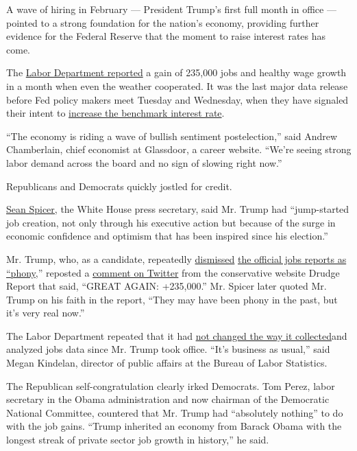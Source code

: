 A wave of hiring in February --- President Trump's first full month in
office --- pointed to a strong foundation for the nation's economy,
providing further evidence for the Federal Reserve that the moment to
raise interest rates has come.

The \href{https://www.bls.gov/news.release/empsit.nr0.htm}{Labor
Department reported} a gain of 235,000 jobs and healthy wage growth in a
month when even the weather cooperated. It was the last major data
release before Fed policy makers meet Tuesday and Wednesday, when they
have signaled their intent to
\href{https://www.nytimes.com/2017/03/03/business/economy/federal-reserve-interest-rates.html}{increase
the benchmark interest rate}.

``The economy is riding a wave of bullish sentiment postelection,'' said
Andrew Chamberlain, chief economist at Glassdoor, a career website.
``We're seeing strong labor demand across the board and no sign of
slowing right now.''

Republicans and Democrats quickly jostled for credit.

\href{http://www.cbsnews.com/live/video/sean-spicer-speaks-on-tweets-on-job-reports/}{Sean
Spicer,} the White House press secretary, said Mr. Trump had
``jump-started job creation, not only through his executive action but
because of the surge in economic confidence and optimism that has been
inspired since his election.''

Mr. Trump, who, as a candidate, repeatedly
\href{https://www.nytimes.com/2016/11/05/opinion/donald-trumps-denial-of-economic-reality.html}{dismissed}
\href{https://www.nytimes.com/2016/11/05/opinion/donald-trumps-denial-of-economic-reality.html}{the
official jobs reports as ``phony},'' reposted a
\href{https://twitter.com/realDonaldTrump}{comment on Twitter} from the
conservative website Drudge Report that said, ``GREAT AGAIN: +235,000.''
Mr. Spicer later quoted Mr. Trump on his faith in the report, ``They may
have been phony in the past, but it's very real now.''

The Labor Department repeated that it had
\href{https://www.nytimes.com/2016/11/04/business/economy/unemployment-labor-department-data-politics.html}{not
changed the way it collected}and analyzed jobs data since Mr. Trump took
office. ``It's business as usual,'' said Megan Kindelan, director of
public affairs at the Bureau of Labor Statistics.

The Republican self-congratulation clearly irked Democrats. Tom Perez,
labor secretary in the Obama administration and now chairman of the
Democratic National Committee, countered that Mr. Trump had ``absolutely
nothing'' to do with the job gains. ``Trump inherited an economy from
Barack Obama with the longest streak of private sector job growth in
history,'' he said.

